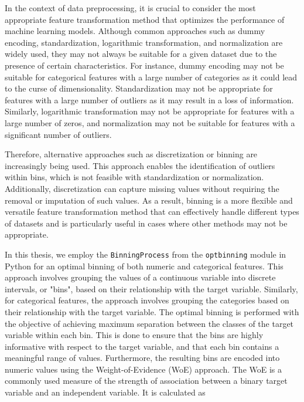 In the context of data preprocessing, it is crucial to consider the most appropriate feature transformation method that optimizes the performance of machine learning models.
Although common approaches such as dummy encoding, standardization, logarithmic transformation, and normalization are widely used, they may not always be suitable for a given dataset due to the presence of certain characteristics.
For instance, dummy encoding may not be suitable for categorical features with a large number of categories as it could lead to the curse of dimensionality.
Standardization may not be appropriate for features with a large number of outliers as it may result in a loss of information.
Similarly, logarithmic transformation may not be appropriate for features with a large number of zeros, and normalization may not be suitable for features with a significant number of outliers.

Therefore, alternative approaches such as discretization or binning are increasingly being used.
This approach enables the identification of outliers within bins, which is not feasible with standardization or normalization.
Additionally, discretization can capture missing values without requiring the removal or imputation of such values.
As a result, binning is a more flexible and versatile feature transformation method that can effectively handle different types of datasets and is particularly useful in cases where other methods may not be appropriate.



In this thesis, we employ the \lstinline{BinningProcess} from the \lstinline{optbinning} module in Python for an optimal binning of both numeric and categorical features.
This approach involves grouping the values of a continuous variable into discrete intervals, or "bins", based on their relationship with the target variable.
Similarly, for categorical features, the approach involves grouping the categories based on their relationship with the target variable.
The optimal binning is performed with the objective of achieving maximum separation between the classes of the target variable within each bin.
This is done to ensure that the bins are highly informative with respect to the target variable, and that each bin contains a meaningful range of values.
Furthermore, the resulting bins are encoded into numeric values using the Weight-of-Evidence (WoE) approach. The WoE is a commonly used measure of the strength of association between a binary target variable and an independent variable. It is calculated as

